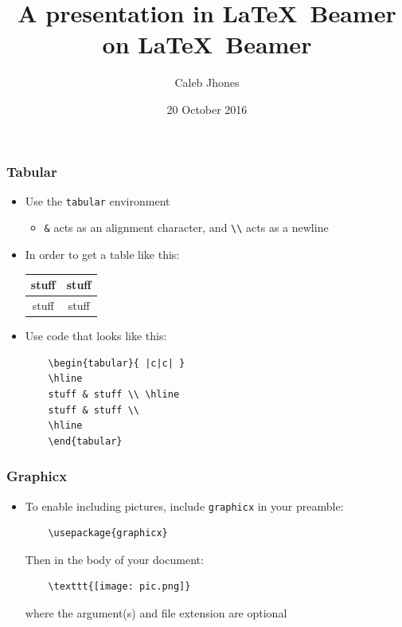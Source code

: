 \documentclass{beamer}
\title{A presentation in \LaTeX\ Beamer on \LaTeX\ Beamer}
\author{Caleb Jhones}
\date{20 October 2016}
\begin{document}
\begin{frame}
    \maketitle
\end{frame}

\begin{frame}[fragile]
\frametitle{Tabular}
\begin{itemize}
    \item Use the \texttt{tabular} environment
        \begin{itemize}
        \item \verb+&+ acts as an alignment character, and \verb+\\+ acts as a newline
        \end{itemize}
    \pause
    \item In order to get a table like this: \\
        \begin{table}
        \centering
        \begin{tabular}{ |c|c| }
        \hline
        stuff & stuff \\ \hline
        stuff & stuff \\
        \hline
        \end{tabular}
        \end{table}
    \pause
    \item Use code that looks like this:
    \begin{lstlisting}
    \begin{tabular}{ |c|c| }
    \hline
    stuff & stuff \\ \hline
    stuff & stuff \\
    \hline
    \end{tabular}
    \end{lstlisting}
\end{itemize}
\end{frame}

\begin{frame}[fragile]
\frametitle{Graphicx}
\begin{itemize}
    \item To enable including pictures, include \texttt{graphicx} in your preamble:
    \begin{lstlisting}
    \usepackage{graphicx}
    \end{lstlisting}
    Then in the body of your document:
    \begin{lstlisting}
    \texttt{[image: pic.png]}
    \end{lstlisting}
    where the argument(s) and file extension are optional
\end{itemize}
\end{frame}
\end{document}
